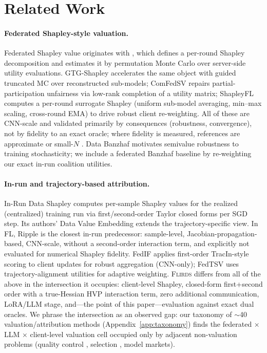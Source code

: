 \section{Related Work}
\label{sec:related}

\paragraph{Federated Shapley-style valuation.}
Federated Shapley value originates with \citet{wang2020fedsv}, which defines a
per-round Shapley decomposition and estimates it by permutation Monte Carlo over
server-side utility evaluations. GTG-Shapley \citep{liu2022gtg} accelerates the
same object with guided truncated MC over reconstructed sub-models; ComFedSV
\citep{fan2022comfedsv} repairs partial-participation unfairness via low-rank
completion of a utility matrix; ShapleyFL \citep{sun2023shapleyfl} computes a
per-round surrogate Shapley (uniform sub-model averaging, min--max scaling,
cross-round EMA) to drive robust client re-weighting. All of these are CNN-scale
and validated primarily by consequences (robustness, convergence), not by
fidelity to an exact oracle; where fidelity is measured, references are
approximate or small-$N$ \citep{space2024}. Data Banzhaf \citep{wang2023banzhaf}
motivates semivalue robustness to training stochasticity; we include a federated
Banzhaf baseline by re-weighting our exact in-run coalition utilities.

\paragraph{In-run and trajectory-based attribution.}
In-Run Data Shapley \citep{wang2024irds} computes per-sample Shapley values for
the realized (centralized) training run via first/second-order Taylor closed
forms per SGD step. Its authors' Data Value Embedding \citep{dvemb2024} extends
the trajectory-specific view. In FL, Ripple \citep{ripple2026} is the closest
in-run predecessor: sample-level, Jacobian-propagation-based, CNN-scale, without
a second-order interaction term, and explicitly not evaluated for numerical
Shapley fidelity. FedIF \citep{fedif2025} applies first-order TracIn-style
scoring to client updates for robust aggregation (CNN-only); FedTSV
\citep{fedtsv2026} uses trajectory-alignment utilities for adaptive weighting.
\textsc{Flirds} differs from all of the above in the intersection it occupies:
client-level Shapley, closed-form first+second order with a true-Hessian HVP
interaction term, zero additional communication, LoRA/LLM stage, and---the point
of this paper---evaluation against exact dual oracles. We phrase the
intersection as an observed gap: our taxonomy of $\sim$40 valuation/attribution
methods (Appendix~\ref{app:taxonomy}) finds the federated $\times$ LLM $\times$
client-level valuation cell occupied only by adjacent non-valuation problems
(quality control \citep{feddqc2024}, selection \citep{fedhds2025}, model markets).

